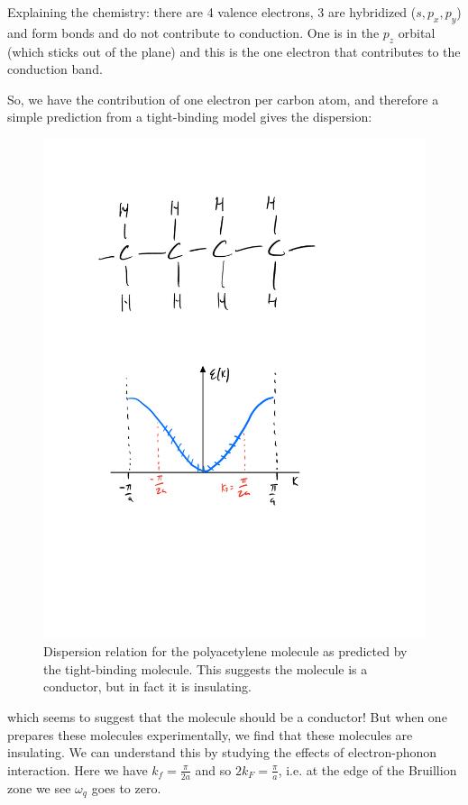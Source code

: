 Explaining the chemistry: there are 4 valence electrons, 3 are hybridized ($s, p_x, p_y$) and form bonds and do not contribute to conduction. One is in the $p_z$ orbital (which sticks out of the plane) and this is the one electron that contributes to the conduction band.

So, we have the contribution of one electron per carbon atom, and therefore a simple prediction from a tight-binding model gives the dispersion:
\begin{figure}[htbp]
    \centering
    \includegraphics[scale=0.6]{Images/fig-polyacetightbinddispersion.pdf}
    \caption{Dispersion relation for the polyacetylene molecule as predicted by the tight-binding molecule. This suggests the molecule is a conductor, but in fact it is insulating.}
    \label{fig-polyacetightbinddispersion}
\end{figure}
which seems to suggest that the molecule should be a conductor! But when one prepares these molecules experimentally, we find that these molecules are insulating. We can understand this by studying the effects of electron-phonon interaction. Here we have $k_f = \frac{\pi}{2a}$ and so $2k_F = \frac{\pi}{a}$, i.e. at the edge of the Bruillion zone we see $\omega_q$ goes to zero.


